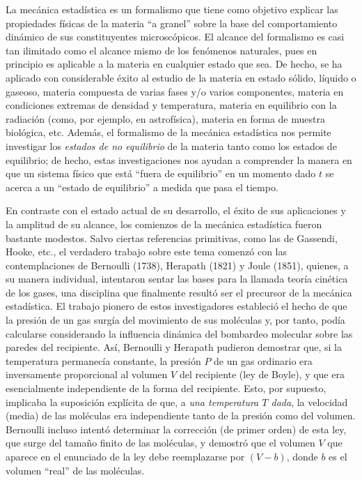 La mecánica estadística es un formalismo que tiene como objetivo explicar las propiedades físicas de la materia \enquote{a granel} sobre la base del comportamiento dinámico de sus constituyentes microscópicos. El alcance del formalismo es casi tan ilimitado como el alcance mismo de los fenómenos naturales, pues en principio es aplicable a la materia en cualquier estado que sea. De hecho, se ha aplicado con considerable éxito al estudio de la materia en estado sólido, líquido o gaseoso, materia compuesta de varias fases y/o varios componentes, materia en condiciones extremas de densidad y temperatura, materia en equilibrio con la radiación (como, por ejemplo, en astrofísica), materia en forma de muestra biológica, etc. Además, el formalismo de la mecánica estadística nos permite investigar los \emph{estados de no equilibrio} de la materia tanto como los estados de equilibrio; de hecho, estas investigaciones nos ayudan a comprender la manera en que un sistema físico que está \enquote{fuera de equilibrio} en un momento dado $t$ se acerca a un \enquote{estado de equilibrio} a medida que pasa el tiempo.
\par
En contraste con el estado actual de su desarrollo, el éxito de sus aplicaciones y la amplitud de su alcance, los comienzos de la mecánica estadística fueron bastante modestos. Salvo ciertas referencias primitivas, como las de Gassendi, Hooke, etc., el verdadero trabajo sobre este tema comenzó con las contemplaciones de Bernoulli (1738), Herapath (1821) y Joule (1851), quienes, a su manera individual, intentaron sentar las bases para la llamada teoría cinética de los gases, una disciplina que finalmente resultó ser el precursor de la mecánica estadística. El trabajo pionero de estos investigadores estableció el hecho de que la presión de un gas surgía del movimiento de sus moléculas y, por tanto, podía calcularse considerando la influencia dinámica del bombardeo molecular sobre las paredes del recipiente. Así, Bernoulli y Herapath pudieron demostrar que, si la temperatura permanecía constante, la presión $P$ de un gas ordinario era inversamente proporcional al volumen $V$ del recipiente (ley de Boyle), y que era esencialmente independiente de la forma del recipiente. Esto, por supuesto, implicaba la suposición explícita de que, a \emph{una temperatura $T$ dada}, la velocidad (media) de las moléculas era independiente tanto de la presión como del volumen. Bernoulli incluso intentó determinar la corrección (de primer orden) de esta ley, que surge del tamaño finito de las moléculas, y demostró que el volumen $V$ que aparece en el enunciado de la ley debe reemplazarse por $(V - b)$, donde $b$ es el volumen \enquote{real} de las moléculas.
